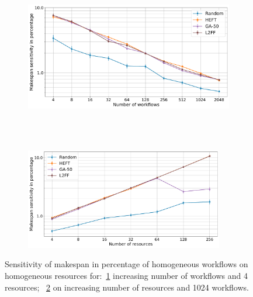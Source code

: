 \begin{figure}[ht!]
    \centering
    \begin{subfigure}[b]{0.75\textwidth}
        \includegraphics[width=.95\textwidth]{figures/campaign/StHomoCampaigns_4DynHomoResourcesSens.pdf}
        \caption{}
        \label{fig:StHomoCampaigns_4DyHomoResourcesSens}
    \end{subfigure}\\
    ~ 
    \begin{subfigure}[b]{0.75\textwidth}
        \includegraphics[width=0.95\textwidth]{figures/campaign/DynHomoResources_StHomoCampaignsSens.pdf}
        \caption{}
        \label{fig:DyHomoResources_StHomoCampaignsSens}
    \end{subfigure}
    \caption{Sensitivity of makespan in percentage of homogeneous workflows on homogeneous resources for:~\ref{fig:StHomoCampaigns_4DyHomoResourcesSens} increasing number of workflows and 4 resources;
        ~\ref{fig:DyHomoResources_StHomoCampaignsSens} on increasing number of resources and 1024 workflows.}
    \label{fig:dyn_homog_sens_analysis}
\end{figure}


